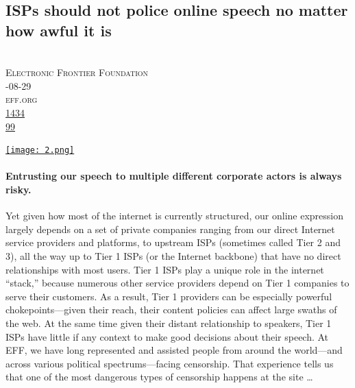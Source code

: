 \documentclass[10pt,a4paper]{article}
\begin{document}
\subsection{ISPs should not police online speech no matter how awful it is}
\noindent\begin{minipage}[t]{0.19\linewidth}
\vspace{0pt}
\noindent\scshape\footnotesize
\\ {\scriptsize\faUser}\space 
Electronic Frontier Foundation
\\ {\scriptsize\faCalendar}-08-29
\\ {\scriptsize\faGlobe}\space 
eff.org
\\ {\scriptsize\faThumbsOUp}\space 
\href{http://news.ycombinator.com/item?id=37313349\&utm\_term=comment}{1434} 
\\ {\scriptsize\faComments}\space 
\href{http://news.ycombinator.com/item?id=37313349\&utm\_term=comment}{99} 
\end{minipage} 
\begin{minipage}[t]{0.80\linewidth}
\vspace{0pt}
\begin{multicols}{2}
    \href{https://www.eff.org/deeplinks/2023/08/isps-should-not-police-online-speech-no-matter-how-awful-it?utm\_source=hackernewsletter\&utm\_medium=email\&utm\_term=fav}{
        \texttt{[image: 2.png]}
    }
\paragraph{Entrusting our speech to multiple different corporate actors is always risky.}
 Yet given how most of the internet is currently structured, our online expression largely depends on a set of private companies ranging from our direct Internet service providers and platforms, to upstream ISPs (sometimes called Tier 2 and 3), all the way up to Tier 1 ISPs (or the Internet backbone) that have no direct relationships with most users.
Tier 1 ISPs play a unique role in the internet “stack,” because numerous other service providers depend on Tier 1 companies to serve their customers. As a result, Tier 1 providers can be especially powerful chokepoints—given their reach, their content policies can affect large swaths of the web. At the same time given their distant relationship to speakers, Tier 1 ISPs have little if any context to make good decisions about their speech.
At EFF, we have long represented and assisted people from around the world—and across various political spectrums—facing censorship. That experience tells us that one of the most dangerous types of censorship happens at the site
\dots
\end{multicols}
\end{minipage}
\par\medskip
\end{document}
